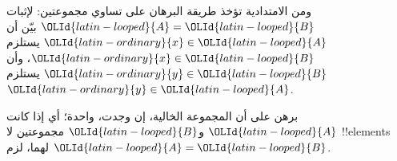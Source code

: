 \documentclass[../../../include/open-logic-section]{subfiles}
\begin{document}
ومن الامتدادية تؤخذ طريقة البرهان على تساوي مجموعتين: لإثبات
${\OLId{latin-looped}{A}} = {\OLId{latin-looped}{B}}$ بيّن أن ${\OLId{latin-ordinary}{x}} \in {\OLId{latin-looped}{A}}$ يستلزم ${\OLId{latin-ordinary}{x}} \in {\OLId{latin-looped}{B}}$، وأن ${\OLId{latin-ordinary}{y}} \in {\OLId{latin-looped}{B}}$
يستلزم ${\OLId{latin-ordinary}{y}} \in {\OLId{latin-looped}{A}}$.

\begin{prob}
برهن على أن المجموعة الخالية، إن وجدت، واحدة؛ أي إذا كانت ${\OLId{latin-looped}{A}}$ و${\OLId{latin-looped}{B}}$
مجموعتين لا !!{element}s لهما، لزم ${\OLId{latin-looped}{A}} = {\OLId{latin-looped}{B}}$.
\end{prob}
\end{document}
